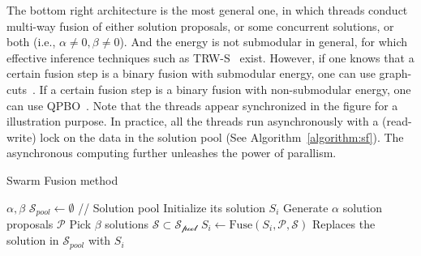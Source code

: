 %
The bottom right architecture is the most general one, in which threads
conduct multi-way fusion of either solution proposals, or some concurrent solutions, or both (i.e.,
$\alpha\ne 0, \beta \ne 0$).
%
And the energy is not submodular
in general, for which effective inference techniques such as
TRW-S~\cite{TRW-S,opengm} exist.
However, if one knows that a certain fusion step is a binary fusion with
submodular energy, one can use
graph-cuts~\cite{alpha_expansion}. If a certain fusion step is a
binary fusion with non-submodular energy, one can use
QPBO~\cite{second_order_stereo}.
%
Note that the threads appear synchronized in the figure for a
illustration purpose. In practice, all the threads run asynchronously
with a (read-write) lock on the data in the solution pool (See
Algorithm~\ref{algorithm:sf}). The asynchronous computing further unleashes the power of parallism.
%
%
%
\begin{algorithm}
 \caption{Swarm Fusion method}
 \label{algorithm:sf}
 \begin{algorithmic}
  \Procedure{} {$\alpha, \beta$}
  \State $\mathcal{S}_{pool} \leftarrow \emptyset$ //
  Solution pool
  \State Initialize its solution $S_i$
  \EndFor
  \State
  \State Generate $\alpha$ solution proposals $\mathcal{P}$ %
  \State Pick $\beta$ solutions $\mathcal{S} \subset \mathcal{S_{\mbox{pool}}}$
  \State $S_i \leftarrow \mbox{Fuse}(S_i, \mathcal{P}, \mathcal{S})$
  \State Replaces the solution in $\mathcal{S}_{pool}$ with $S_i$
  \EndFor
  \EndProcedure
 \end{algorithmic}
\end{algorithm}



